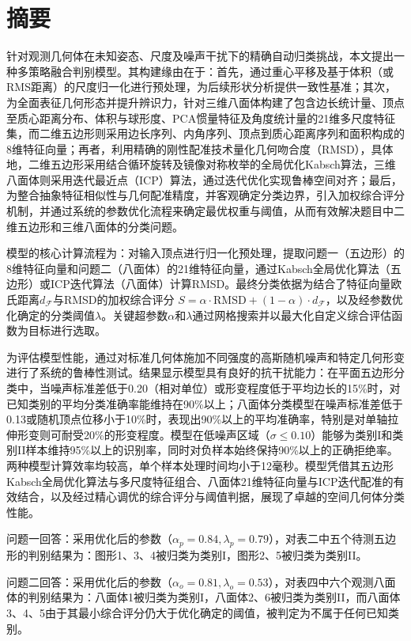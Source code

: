 \section*{摘要}

针对观测几何体在未知姿态、尺度及噪声干扰下的精确自动归类挑战，本文提出一种多策略融合判别模型。其构建缘由在于：首先，通过重心平移及基于体积（或RMS距离）的尺度归一化进行预处理，为后续形状分析提供一致性基准；其次，为全面表征几何形态并提升辨识力，针对三维八面体构建了包含边长统计量、顶点至质心距离分布、体积与球形度、PCA惯量特征及角度统计量的21维多尺度特征集，而二维五边形则采用边长序列、内角序列、顶点到质心距离序列和面积构成的8维特征向量；再者，利用精确的刚性配准技术量化几何吻合度（RMSD），具体地，二维五边形采用结合循环旋转及镜像对称枚举的全局优化Kabsch算法，三维八面体则采用迭代最近点（ICP）算法，通过迭代优化实现鲁棒空间对齐；最后，为整合抽象特征相似性与几何配准精度，并客观确定分类边界，引入加权综合评分机制，并通过系统的参数优化流程来确定最优权重与阈值，从而有效解决题目中二维五边形和三维八面体的分类问题。

模型的核心计算流程为：对输入顶点进行归一化预处理，提取问题一（五边形）的8维特征向量和问题二（八面体）的21维特征向量，通过Kabsch全局优化算法（五边形）或ICP迭代算法（八面体）计算RMSD。最终分类依据为结合了特征向量欧氏距离$d_{\mathcal{F}}$与RMSD的加权综合评分 $S = \alpha \cdot \text{RMSD} + (1-\alpha) \cdot d_{\mathcal{F}}$，以及经参数优化确定的分类阈值$\lambda$。关键超参数$\alpha$和$\lambda$通过网格搜索并以最大化自定义综合评估函数为目标进行选取。

为评估模型性能，通过对标准几何体施加不同强度的高斯随机噪声和特定几何形变进行了系统的鲁棒性测试。结果显示模型具有良好的抗干扰能力：在平面五边形分类中，当噪声标准差低于0.20（相对单位）或形变程度低于平均边长的15\%时，对已知类别的平均分类准确率能维持在90\%以上；八面体分类模型在噪声标准差低于0.13或随机顶点位移小于10\%时，表现出90\%以上的平均准确率，特别是对单轴拉伸形变则可耐受20\%的形变程度。模型在低噪声区域（$\sigma \leq 0.10$）能够为类别I和类别II样本维持95\%以上的识别率，同时对负样本始终保持90\%以上的正确拒绝率。两种模型计算效率均较高，单个样本处理时间均小于12毫秒。模型凭借其五边形Kabsch全局优化算法与多尺度特征组合、八面体21维特征向量与ICP迭代配准的有效结合，以及经过精心调优的综合评分与阈值判据，展现了卓越的空间几何体分类性能。

问题一回答：采用优化后的参数（$\alpha_p=0.84, \lambda_p=0.79$），对表二中五个待测五边形的判别结果为：图形1、3、4被归类为类别I，图形2、5被归类为类别II。

问题二回答：采用优化后的参数（$\alpha_o=0.81, \lambda_o=0.53$），对表四中六个观测八面体的判别结果为：八面体1被归类为类别I，八面体2、6被归类为类别II，而八面体3、4、5由于其最小综合评分仍大于优化确定的阈值，被判定为不属于任何已知类别。


